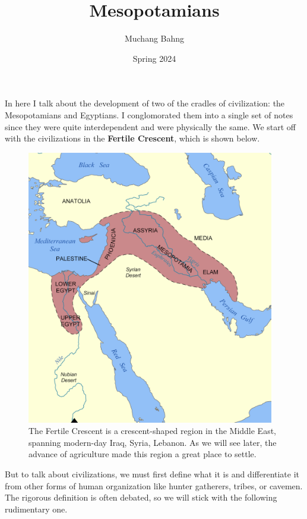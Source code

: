 \documentclass{article}
\begin{document}
\title{Mesopotamians}
\author{Muchang Bahng}
\date{Spring 2024}

\maketitle
\tableofcontents
\pagebreak

  In here I talk about the development of two of the cradles of civilization: the Mesopotamians and Egyptians. I conglomorated them into a single set of notes since they were quite interdependent and were physically the same. We start off with the civilizations in the \textbf{Fertile Crescent}, which is shown below. 

  \begin{figure}[H]
    \centering 
    \includegraphics[scale=0.4]{img/fertile_crescent.png}
    \caption{The Fertile Crescent is a crescent-shaped region in the Middle East, spanning modern-day Iraq, Syria, Lebanon. As we will see later, the advance of agriculture made this region a great place to settle. } 
    \label{fig:fertile_crescent}
  \end{figure}

  But to talk about civilizations, we must first define what it is and differentiate it from other forms of human organization like hunter gatherers, tribes, or cavemen. The rigorous definition is often debated, so we will stick with the following rudimentary one. 
\end{document}

